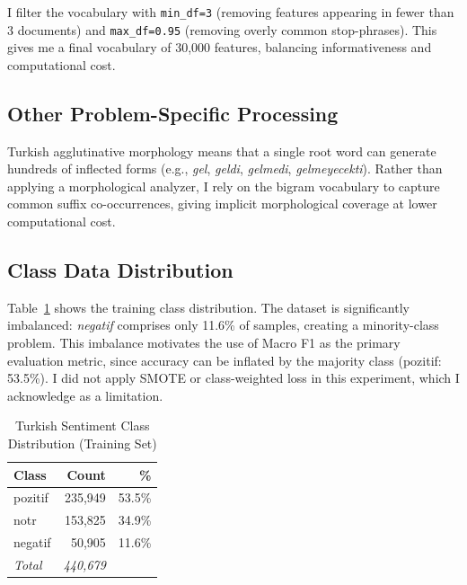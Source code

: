 \documentclass[conference]{IEEEtran}
\begin{document}
I filter the vocabulary with \texttt{min\_df=3} (removing features appearing in fewer
than 3 documents) and \texttt{max\_df=0.95} (removing overly common stop-phrases).
This gives me a final vocabulary of 30,000 features, balancing informativeness and
computational cost.

\subsection{Other Problem-Specific Processing}

Turkish agglutinative morphology means that a single root word can generate hundreds
of inflected forms (e.g., \textit{gel}, \textit{geldi}, \textit{gelmedi},
\textit{gelmeyecekti}). Rather than applying a morphological analyzer, I rely on the bigram vocabulary to
capture common suffix co-occurrences, giving implicit morphological coverage at
lower computational cost.

\subsection{Class Data Distribution}

Table~\ref{tab:class_dist} shows the training class distribution. The dataset is
significantly imbalanced: \textit{negatif} comprises only 11.6\% of samples, creating
a minority-class problem. This imbalance motivates the use of Macro F1 as the primary
evaluation metric, since accuracy can be inflated by the majority class (pozitif: 53.5\%).
I did not apply SMOTE or class-weighted loss in this experiment, which I acknowledge
as a limitation.

\begin{table}[htbp]
	\caption{Turkish Sentiment Class Distribution (Training Set)}
	\label{tab:class_dist}
	\begin{center}
		\footnotesize
		\renewcommand{\arraystretch}{1.2}
		\setlength{\tabcolsep}{8pt}
		\begin{tabular}{lrr}
			\toprule
			\rowcolor{headerblue}
			\color{white}\textbf{Class} & \color{white}\textbf{Count} & \color{white}\textbf{\%} \\
			\midrule
			pozitif   & 235,949 & 53.5\% \\
			notr      & 153,825 & 34.9\% \\
			negatif   &  50,905 & 11.6\% \\
			\midrule
			\textit{Total} & \textit{440,679} & \\
			\bottomrule
		\end{tabular}
	\end{center}
\end{table}
\end{document}
